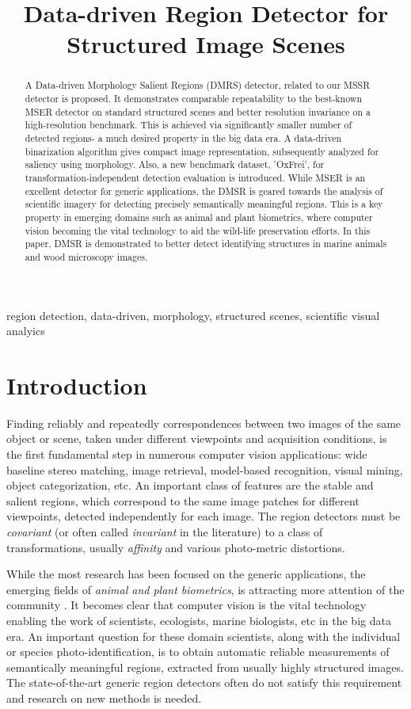 \documentclass{article}
\title{Data-driven Region Detector for Structured Image Scenes}
\begin{document}
%
\maketitle
%
\begin{abstract}
A Data-driven Morphology Salient Regions (DMRS) detector, related to our MSSR detector is proposed.
It demonstrates comparable repeatability to the best-known MSER detector on standard structured scenes and better resolution invariance on a high-resolution benchmark. This is achieved via significantly smaller number of detected regions- a much desired property in the big data era. A data-driven binarization algorithm gives compact image representation, subsequently analyzed for saliency using morphology.  Also, a new benchmark dataset, 'OxFrei', for transformation-independent detection evaluation is introduced.
While MSER is an excellent detector for generic applications, the DMSR is geared towards the analysis of scientific imagery for detecting precisely semantically meaningful regions. This is a key property in emerging domains such as animal and plant biometrics, where computer vision becoming the vital technology to aid the wild-life preservation efforts. In this paper, DMSR is demonstrated to better detect identifying structures in marine animals and wood microscopy images.

\end{abstract}
%
\begin{keywords}
region detection, data-driven, morphology, structured scenes, scientific visual analyics
\end{keywords}
%
\section{Introduction}
\label{sec:intro}
Finding reliably and repeatedly correspondences between two images of the same object or scene, taken under different viewpoints and acquisition conditions, is the first fundamental step in numerous computer vision applications: wide baseline stereo matching, image retrieval, model-based recognition, visual mining, object categorization, etc. An important class of features are the stable and salient regions, which correspond to the same image patches for different viewpoints, detected independently for each image. The region detectors must be {\em covariant} (or often called {\em invariant} in the literature) to a class of transformations, usually {\em affinity} and various photo-metric distortions. 

While the most research has been focused on the generic applications, the emerging fields of {\em animal and plant biometrics}, is attracting more attention of the community \cite{Kuehl2013, leafsnap_eccv2012}. It becomes clear that computer vision is the vital technology enabling the work of scientists, ecologists, marine biologists, etc in the big data era. An important question for these domain scientists, along with the individual or species photo-identification, is to obtain automatic reliable measurements of semantically meaningful regions, extracted from usually highly structured images. The state-of-the-art generic region detectors often do not satisfy this requirement and research on new methods is needed.
\end{document}
